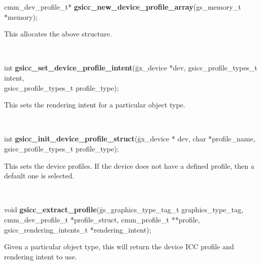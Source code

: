 \documentclass[12pt,notitlepage]{article}
\begin{document}
\noindent cmm\_dev\_profile\_t* {\bf gsicc\_new\_device\_profile\_array}(gs\_memory\_t *memory);\\

\begin{minipage}[h]{6.0in}
This allocates the above structure.
\end{minipage}\\

\begin{tabbing}
\noindent int {\bf gsicc\_set\_device\_profile\_intent}(\=gx\_device *dev, gsicc\_profile\_types\_t intent,\\
\>gsicc\_profile\_types\_t profile\_type);\\
\end{tabbing}

\begin{minipage}[h]{6.0in}
This sets the rendering intent for a particular object type.
\end{minipage}\\

\begin{tabbing}
\noindent int {\bf gsicc\_init\_device\_profile\_struct}(\=gx\_device * dev,  char *profile\_name,\\
\>gsicc\_profile\_types\_t profile\_type);\\
\end{tabbing}

\begin{minipage}[h]{6.0in}
This sets the device profiles. If the device does not have a defined profile, then a default one is selected.
\end{minipage}\\

\begin{tabbing}
\noindent void {\bf gsicc\_extract\_profile}(\=gs\_graphics\_type\_tag\_t graphics\_type\_tag,\\
                       \>cmm\_dev\_profile\_t *profile\_struct,
                       cmm\_profile\_t **profile,\\
                       \>gsicc\_rendering\_intents\_t *rendering\_intent);\\
\end{tabbing}

\begin{minipage}[h]{6.0in}
Given a particular object type, this will return the device ICC profile and rendering intent to use.
\end{minipage}\\
\end{document}
